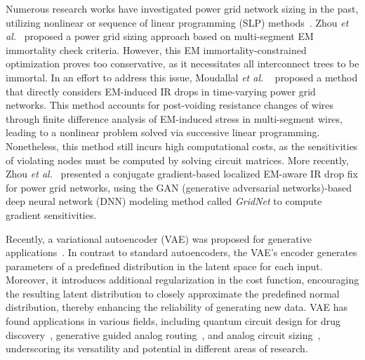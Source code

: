 Numerous research works have investigated power grid network sizing in the past, utilizing nonlinear or sequence of linear programming (SLP) methods~\cite{ChBr:TCAD'88,DuMa:DAC'89,Tan:DAC'99,Wang:TCAD'05,ZhouSun:TVLSI'19, Sukharev:2019pg,ZhouYu:ASPDAC'20,ZhouJin:ICCAD'20}. Zhou {\it et al.}~\cite{ZhouSun:TVLSI'19,ZhouChen:Integration'21} proposed a power grid sizing approach based on multi-segment EM immortality check criteria. However, this EM immortality-constrained optimization proves too conservative, as it necessitates all interconnect trees to be immortal. In an effort to address this issue, Moudallal {\it et al.}
~\cite{Sukharev:2019pg} proposed a method that directly considers EM-induced IR drops in time-varying power grid networks. This method accounts for post-voiding resistance changes of wires through finite difference analysis of EM-induced stress in multi-segment wires, leading to a nonlinear problem solved via successive linear programming. Nonetheless, this method still incurs high computational costs, as the sensitivities of violating nodes must be computed by solving circuit matrices. More recently, Zhou {\it et al.}~\cite{ZhouJin:ICCAD'20, HanLiu:TCAD'22-23} presented a conjugate gradient-based localized EM-aware IR drop fix for power grid networks, using the GAN (generative adversarial networks)-based deep neural network (DNN) modeling method called {\it GridNet} to compute gradient sensitivities.


   

Recently, a variational autoencoder (VAE) was proposed for generative applications~\cite{Diederik:arxiv'22}. In contrast to standard autoencoders, the VAE's encoder generates parameters of a predefined distribution in the latent space for each input. Moreover, it introduces additional regularization in the cost function, encouraging the resulting latent distribution to closely approximate the predefined normal distribution, thereby enhancing the reliability of generating new data. VAE has found applications in various fields, including quantum circuit design for drug discovery~\cite{Li:DATE'22}, generative guided analog routing~\cite{Zhu:ICCAD'19}, and analog circuit sizing~\cite{Touloupas:SMACD'22}, underscoring its versatility and potential in different areas of research.

